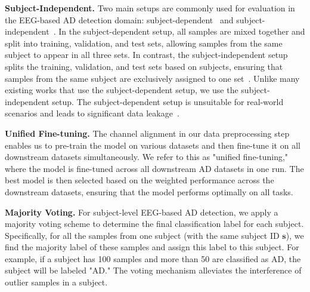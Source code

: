 \textbf{Subject-Independent.}  
Two main setups are commonly used for evaluation in the EEG-based AD detection domain: subject-dependent~\cite{nour2024novel,kumar2023eegalzheimer} and subject-independent~\cite{watanabe2024deep,chen2024multi}. In the subject-dependent setup, all samples are mixed together and split into training, validation, and test sets, allowing samples from the same subject to appear in all three sets. In contrast, the subject-independent setup splits the training, validation, and test sets based on subjects, ensuring that samples from the same subject are exclusively assigned to one set~\cite{wang2024medformer}. Unlike many existing works that use the subject-dependent setup, we use the subject-independent setup. The subject-dependent setup is unsuitable for real-world scenarios and leads to significant data leakage~\cite{wang2024evaluate}.


\textbf{Unified Fine-tuning.} 
The channel alignment in our data preprocessing step enables us to pre-train the model on various datasets and then fine-tune it on all downstream datasets simultaneously. We refer to this as "unified fine-tuning," where the model is fine-tuned across all downstream AD datasets in one run. The best model is then selected based on the weighted performance across the downstream datasets, ensuring that the model performs optimally on all tasks.


\textbf{Majority Voting.}  
For subject-level EEG-based AD detection, we apply a majority voting scheme to determine the final classification label for each subject. Specifically, for all the samples from one subject (with the same subject ID $\bm{s}$), we find the majority label of these samples and assign this label to this subject. For example, if a subject has 100 samples and more than 50 are classified as AD, the subject will be labeled "AD." The voting mechanism alleviates the interference of outlier samples in a subject.
